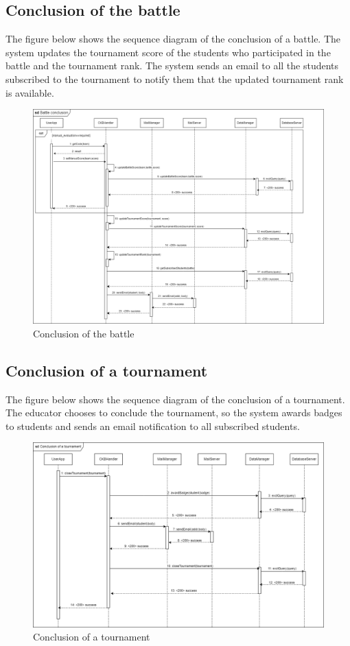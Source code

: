 \subsection{Conclusion of the battle}
The figure below shows the sequence diagram of the conclusion of a battle. The system updates the tournament
score of the students who participated in the battle and the tournament rank. The system sends an email to all the students subscribed
to the tournament to notify them that the updated tournament rank is available.\\
\begin{figure}[H]
    \centering
    \includegraphics[width=1\textwidth]{images/seq_diagrams/battle_conclusion_DD.png}
    \caption{Conclusion of the battle}
\end{figure}
\clearpage

\subsection{Conclusion of a tournament}
The figure below shows the sequence diagram of the conclusion of a tournament. The educator chooses to conclude the tournament, so the system 
awards badges to students and sends an email notification to all subscribed students.\\
\begin{figure}[H]
    \centering
    \includegraphics[width=1\textwidth]{images/seq_diagrams/tournament_conclusion_DD.png}
    \caption{Conclusion of a tournament}
\end{figure}
\clearpage

